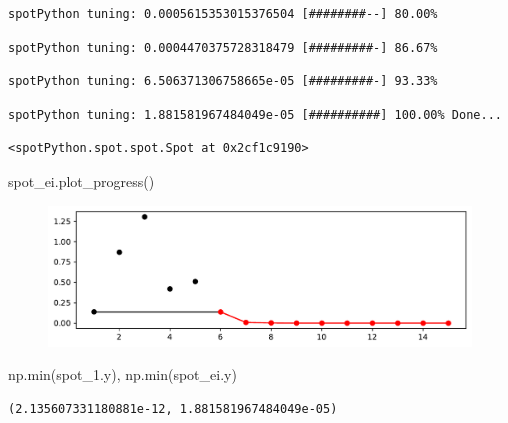 \documentclass[
  letterpaper,
  DIV=11,
  numbers=noendperiod]{scrreprt}
\newenvironment{Shaded}{\begin{snugshade}}{\end{snugshade}}
\newcommand{\BuiltInTok}[1]{\textcolor[rgb]{0.00,0.23,0.31}{#1}}
\newcommand{\NormalTok}[1]{\textcolor[rgb]{0.00,0.23,0.31}{#1}}
\begin{document}
\begin{verbatim}
spotPython tuning: 0.0005615353015376504 [########--] 80.00% 
\end{verbatim}

\begin{verbatim}
spotPython tuning: 0.0004470375728318479 [#########-] 86.67% 
\end{verbatim}

\begin{verbatim}
spotPython tuning: 6.506371306758665e-05 [#########-] 93.33% 
\end{verbatim}

\begin{verbatim}
spotPython tuning: 1.881581967484049e-05 [##########] 100.00% Done...
\end{verbatim}

\begin{verbatim}
<spotPython.spot.spot.Spot at 0x2cf1c9190>
\end{verbatim}

\begin{Shaded}
\begin{Highlighting}[]
\NormalTok{spot\_ei.plot\_progress()}
\end{Highlighting}
\end{Shaded}

\begin{figure}[H]

{\centering \includegraphics{012_num_spot_ei_files/figure-pdf/cell-19-output-1.pdf}

}

\end{figure}

\begin{Shaded}
\begin{Highlighting}[]
\NormalTok{np.}\BuiltInTok{min}\NormalTok{(spot\_1.y), np.}\BuiltInTok{min}\NormalTok{(spot\_ei.y)}
\end{Highlighting}
\end{Shaded}

\begin{verbatim}
(2.135607331180881e-12, 1.881581967484049e-05)
\end{verbatim}
\end{document}
